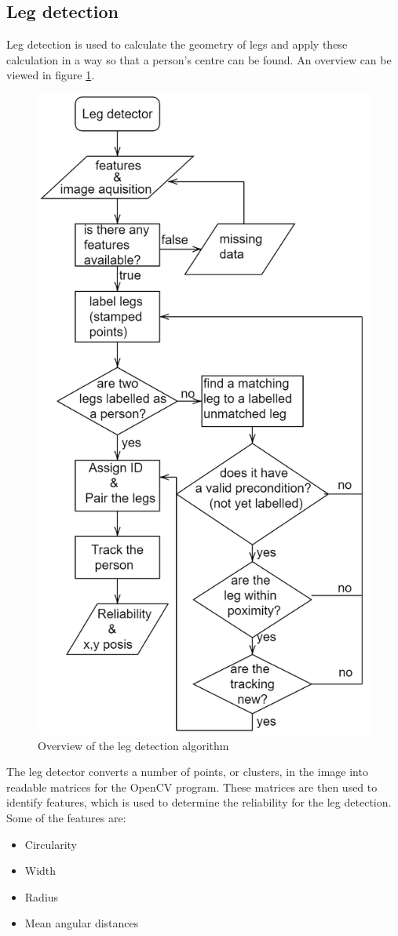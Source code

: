 \subsection{Leg detection} \label{sec:LegDetect}
Leg detection is used to calculate the geometry of legs and apply these calculation in a way so that a person's centre can be found. An overview can be viewed in figure \ref{fig:legflow}.
\begin{figure}[H]
    \centering
    \includegraphics[width=.6\textwidth]{figures/leg2.png}
    \caption{Overview of the leg detection algorithm}
    \label{fig:legflow}
\end{figure}

The leg detector converts a number of points, or clusters, in the image into readable matrices for the OpenCV program. These matrices are then used to identify features, which is used to determine the reliability for the leg detection. Some of the features are:

\begin{itemize}
    \item Circularity
    \item Width
    \item Radius
    \item Mean angular distances
\end{itemize}

